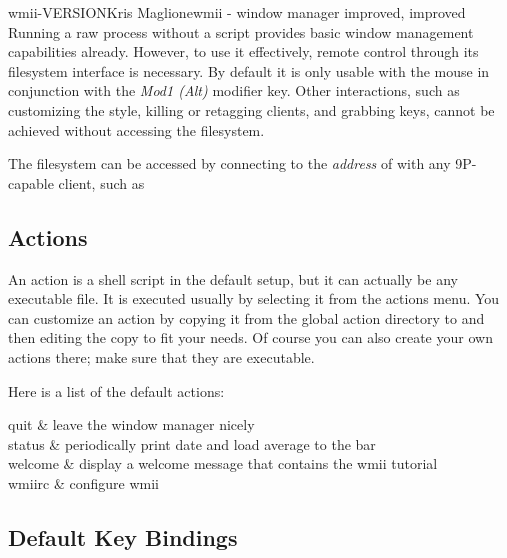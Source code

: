\begin{Name}{1}{wmii-VERSION}{Kris Maglione}{}{wmii - window manager improved, improved}
Running a raw  process without a  script
provides basic window management capabilities already. However, to
use it effectively, remote control through its filesystem interface
is necessary.  By default it is only usable with the mouse in
conjunction with the \emph{Mod1 (Alt)} modifier key. Other
interactions, such as customizing the style, killing or retagging
clients, and grabbing keys, cannot be achieved without accessing the
filesystem.

The filesystem can be accessed by connecting to the \emph{address}
of  with any 9P-capable client, such as 

\subsection{Actions}

An action is a shell script in the default setup, but it can
actually be any executable file.  It is executed usually by
selecting it from the actions menu.  You can customize an action by
copying it from the global action directory
 to  and then
editing the copy to fit your needs.  Of course you can also create
your own actions there; make sure that they are executable.

Here is a list of the default actions:

\begin{Table}[]{2}
quit	& leave the window manager nicely \\
status	& periodically print date and load average to the bar \\
welcome	& display a welcome message that contains the wmii tutorial \\
wmiirc	& configure wmii \\
\end{Table}

\subsection{Default Key Bindings}

\end{Name}
